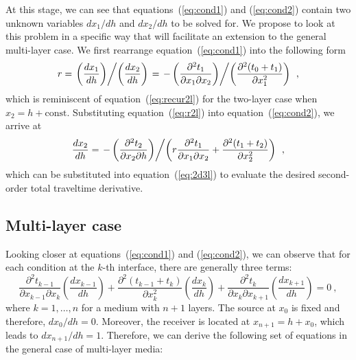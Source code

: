 At this stage, we can see that equations~(\ref{eq:cond1}) and (\ref{eq:cond2}) contain two unknown variables $dx_1/dh$ and $dx_2/dh$ to be solved for. We propose to look at this problem in a specific way that will facilitate an extension to the general multi-layer case. We first rearrange equation~(\ref{eq:cond1}) into the following form
 \begin{equation}
 \label{eq:r2l}
 r = \left. \left( \frac{d x_1}{d h}\right) \middle/ \left( \frac{d x_2}{d h}\right)\right. = \left. -\left( \frac{\partial^2 t_1}{\partial x_1 \partial x_2} \right) \middle/ \left( \frac{\partial^2 (t_0 + t_1)}{\partial x_1^2} \right)\right. ~,
 \end{equation}
which is reminiscent of equation~(\ref{eq:recur2l}) for the two-layer case when $x_2 = h + \text{const}$.  Substituting equation~(\ref{eq:r2l}) into equation~(\ref{eq:cond2}), we arrive at
 \begin{equation}
  \frac{dx_2}{dh} =  \left. -\left( \frac{\partial^2 t_2}{\partial x_2 \partial h} \right) \middle/ \left( r \frac{\partial^2 t_1}{\partial x_1 \partial x_2}  + \frac{\partial^2 (t_1 + t_2)}{\partial x_2^2} \right)\right.  ~,
 \end{equation}
 which can be substituted into equation~(\ref{eq:2d3l}) to evaluate the desired second-order total traveltime derivative.
 

\subsection{Multi-layer case}
Looking closer at equations~(\ref{eq:cond1}) and (\ref{eq:cond2}), we can observe that for each condition at the $k$-th interface, there are generally three terms:
\begin{equation}
\frac{\partial^2 t_{k-1}}{\partial x_{k-1} \partial x_k} \left( \frac{d x_{k-1}}{d h}\right) + \frac{\partial^2 (t_{k-1} + t_k)}{\partial x_k^2} \left( \frac{d x_k}{d h}\right) + \frac{\partial^2 t_k}{\partial x_k \partial x_{k+1}}\left( \frac{d x_{k+1}}{d h}\right) = 0~,
\end{equation}
where $k = 1, \dots, n$ for a medium with $n+1$ layers. The source at $x_0$ is fixed and therefore, $dx_0/dh = 0$. Moreover, the receiver is located at $x_{n+1} = h + x_0$, which leads to $dx_{n+1} /dh = 1$. Therefore, we can derive the following set of equations in the general case of multi-layer media:

